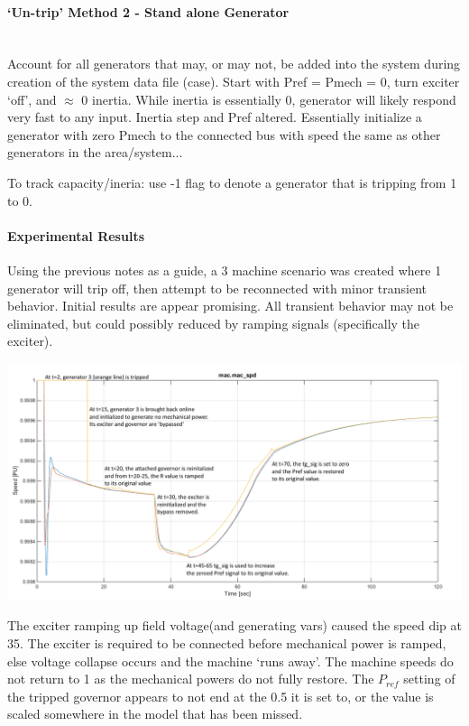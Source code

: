 \documentclass[12pt]{article}
\begin{document}
\paragraph{`Un-trip' Method 2 - Stand alone Generator } \ \\
Account for all generators that may, or may not, be added into the system during creation of the system data file (case).
Start with Pref = Pmech = 0, turn exciter `off', and $\approx$ 0 inertia.
While inertia is essentially 0, generator will likely respond very fast to any input.
Inertia step and Pref altered.
Essentially initialize a generator with zero Pmech to the connected bus with speed the same as other generators in the area/system...

To track capacity/ineria: use -1 flag to denote a generator that is tripping from 1 to 0.

\pagebreak
\begin{landscape}

\paragraph{Experimental Results}
Using the previous notes as a guide, a 3 machine scenario was created where 1 generator will trip off, then attempt to be reconnected with minor transient behavior.
Initial results are appear promising.
All transient behavior may not be eliminated, but could possibly reduced by ramping signals (specifically the exciter).
\begin{center}
\includegraphics[width=.95\linewidth]{machineSpeedsNotes}
\end{center}

The exciter ramping up field voltage(and generating vars) caused the speed dip at 35.
The exciter is required to be connected before mechanical power is ramped, else voltage collapse occurs and the machine `runs away'.
The machine speeds do not return to 1 as the mechanical powers do not fully restore.
The $P_{ref}$ setting of the tripped governor appears to not end at the 0.5 it is set to, or the value is scaled somewhere in the model that has been missed.
\end{landscape}
\end{document}

